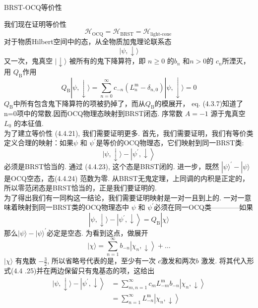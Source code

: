 \centerline{\Large BRST-OCQ等价性}
我们现在证明等价性
\begin{equation}
\mathscr{H}_{\mathrm{OCQ}}=\mathscr{H}_{\mathrm{BRST}}=\mathscr{H}_{\text {light-cone }}
\end{equation}
对于物质Hilbert空间中的态，从全物质加鬼理论联系态
\begin{equation}
|\psi, \downarrow\rangle
\end{equation}
又一次，鬼真空 $|\downarrow\rangle$ 被所有的鬼下降算符，即  $n \geq 0$ 的$b_{n}$ 和$n>0 $的 $c_{n}$所湮灭，用 $Q_{\mathrm{B}}$作用
\begin{equation}
Q_{\mathrm{B}}|\psi, \downarrow\rangle=\sum_{n=0}^{\infty} c_{-n}\left(L_{n}^{\mathrm{m}}-\delta_{n, 0}\right)|\psi, \downarrow\rangle=0
\end{equation}
$Q_{\mathrm{B}}$中所有包含鬼下降算符的项被扔掉了，而从$Q_{\mathrm{B}}$的模展开， eq. (4.3.7)知道了n=0项中的常数.因而OCQ物理态映射到BRST闭态. 序常数 $A=-1$ 源于鬼真空 $L_{0}$ 的本征值.\\
为了建立等价性 (4.4.21), 我们需要证明更多. 首先，我们需要证明，我们有等价类定义合理的映射：如果$\psi$ 和 $\psi^{\prime}$是等价的OCQ物理态，它们映射到同一BRST类:
\begin{equation}
|\psi, \downarrow\rangle-\left|\psi^{\prime}, \downarrow\right\rangle
\end{equation}
必须是BRST恰当的. 通过 (4.4.23), 这个态是BRST闭的. 进一步，既然 $|\psi\rangle^{\prime}-|\psi\rangle$ 是OCQ空态，态(4.4.24) 范数为零. 从BRST无鬼定理，上同调的内积是正定的，所以零范闭态是BRST恰当的，正是我们要证明的.\\
为了得出我们有一同构这一结论，我们需要证明映射是一对一且到上的. 一对一意味着映射到同一BRST类的OCQ物理态中 $\psi$ 和 $\psi^{\prime}$必须在同一OCQ类————如果
\begin{equation}
|\psi, \downarrow\rangle-\left|\psi^{\prime}, \downarrow\right\rangle=Q_{\mathrm{B}}|\chi\rangle
\end{equation}
那么$|\psi\rangle-|\psi\rangle^{\prime}$必定是空态. 为看到这点，做展开
\begin{equation}
|\chi\rangle=\sum_{n=1}^{\infty} b_{-n}\left|\chi_{n}, \downarrow\right\rangle+\ldots
\end{equation}
$|\chi\rangle$ 有鬼数 $-\frac{3}{2}$, 所以省略号代表的是，至少有一次 $c$激发和两次$b$ 激发. 将其代入形式(4.4 .25)并在两边保留只有鬼基态的项，这给出
\begin{equation}
\begin{aligned}
|\psi, \downarrow\rangle-\left|\psi^{\prime}, \downarrow\right\rangle &=\sum_{m, n=1}^{\infty} c_{m} L_{-m}^{\mathrm{m}} b_{-n}\left|\chi_{n}, \downarrow\right\rangle \\
&=\sum_{n=1}^{\infty} L_{-n}^{\mathrm{m}}\left|\chi_{n}, \downarrow\right\rangle
\end{aligned}
\end{equation}
